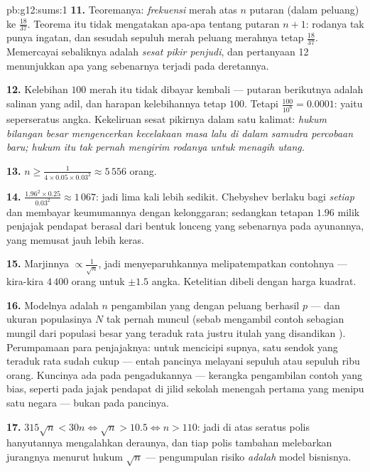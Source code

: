 \begin{solution}{pb:g12:sums:1}
\textbf{11.} Teoremanya: \emph{frekuensi} merah atas
$n$ putaran  (dalam peluang) ke $\frac{18}{37}$. Teorema itu
tidak mengatakan apa-apa tentang putaran $n + 1$: rodanya tak punya ingatan, dan
sesudah sepuluh merah peluang merahnya tetap $\frac{18}{37}$.
Memercayai sebaliknya adalah \emph{sesat pikir penjudi}, dan
pertanyaan 12 menunjukkan apa yang sebenarnya terjadi pada deretannya.

\textbf{12.} Kelebihan $100$ merah itu tidak dibayar kembali ---
putaran berikutnya adalah salinan yang adil, dan harapan kelebihannya tetap $100$.
Tetapi $\frac{100}{10^6} = 0.0001$: yaitu seperseratus angka.
Kekeliruan sesat pikirnya dalam satu kalimat: \emph{hukum bilangan
besar mengencerkan kecelakaan masa lalu di dalam samudra percobaan baru; hukum itu
tak pernah mengirim rodanya untuk menagih utang.}

\textbf{13.} $n \geq \frac{1}{4 \times 0.05 \times 0.03^2}
\approx 5\,556$ orang.

\textbf{14.} $\frac{1.96^2 \times 0.25}{0.03^2} \approx
1\,067$: jadi lima kali lebih sedikit. Chebyshev berlaku bagi \emph{setiap}
 dan membayar keumumannya dengan kelonggaran; sedangkan
tetapan $1.96$ milik penjajak pendapat berasal dari bentuk lonceng yang sebenarnya
pada ayunannya, yang memusat jauh lebih keras.

\textbf{15.} Marjinnya $\propto \frac{1}{\sqrt n}$, jadi menyeparuhkannya
melipatempatkan contohnya --- kira-kira $4\,400$ orang untuk
$\pm 1.5$ angka. Ketelitian dibeli dengan harga kuadrat.

\textbf{16.} Modelnya adalah $n$ pengambilan yang  dengan peluang
berhasil $p$ --- dan ukuran populasinya $N$ tak pernah muncul
(sebab mengambil contoh sebagian mungil dari populasi besar yang teraduk rata
justru itulah yang disandikan ). Perumpamaan para penjajaknya: untuk
mencicipi supnya, satu sendok yang teraduk rata sudah cukup ---
entah pancinya melayani sepuluh atau sepuluh ribu orang. Kuncinya ada pada
pengadukannya --- kerangka pengambilan contoh yang bias, seperti pada jajak pendapat
di jilid sekolah menengah pertama yang menipu satu negara --- bukan pada pancinya.

\textbf{17.} $315\sqrt n < 30n \iff \sqrt n > 10.5 \iff
n > 110$: jadi di atas seratus polis hanyutannya mengalahkan
deraunya, dan tiap polis tambahan melebarkan jurangnya menurut
hukum $\sqrt n$ --- pengumpulan risiko \emph{adalah} model bisnisnya.


\end{solution}
